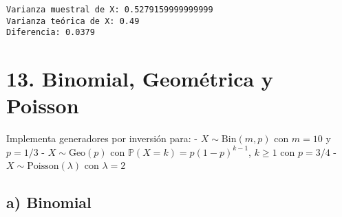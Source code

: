 \documentclass[10pt,a4paper]{article}
\begin{document}
    \begin{Verbatim}[commandchars=\\\{\}]
Varianza muestral de X: 0.5279159999999999
Varianza teórica de X: 0.49
Diferencia: 0.0379
    \end{Verbatim}

    \hypertarget{binomial-geomuxe9trica-y-poisson}{%
\section{13. Binomial, Geométrica y
Poisson}\label{binomial-geomuxe9trica-y-poisson}}

    Implementa generadores por inversión para: - \(X\sim\mathrm{Bin}(m,p)\)
con \(m = 10\) y \(p = 1/3\) - \(X\sim\mathrm{Geo}(p)\) con
\(\mathbb P(X=k)=p(1-p)^{k-1}\), \(k\geq 1\) con \(p = 3/4\) -
\(X\sim\mathrm{Poisson}(\lambda)\) con \(\lambda = 2\)

    \hypertarget{a-binomial}{%
\subsection{a) Binomial}\label{a-binomial}}
\end{document}
